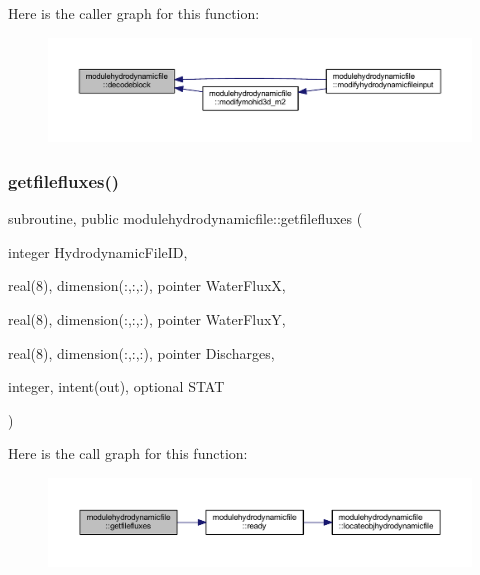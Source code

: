 Here is the caller graph for this function\+:\nopagebreak
\begin{figure}[H]
\begin{center}
\leavevmode
\includegraphics[width=350pt]{namespacemodulehydrodynamicfile_ae7f1a97acd1cc5b22e6ff9e638243e70_icgraph}
\end{center}
\end{figure}
\mbox{\label{namespacemodulehydrodynamicfile_a59c8f54e1b85d7dc3765167672866ffb}} 
\subsubsection{\texorpdfstring{getfilefluxes()}{getfilefluxes()}}
{\footnotesize\ttfamily subroutine, public modulehydrodynamicfile\+::getfilefluxes (\begin{DoxyParamCaption}\item[{integer}]{Hydrodynamic\+File\+ID,  }\item[{real(8), dimension(\+:,\+:,\+:), pointer}]{Water\+FluxX,  }\item[{real(8), dimension(\+:,\+:,\+:), pointer}]{Water\+FluxY,  }\item[{real(8), dimension(\+:,\+:,\+:), pointer}]{Discharges,  }\item[{integer, intent(out), optional}]{S\+T\+AT }\end{DoxyParamCaption})}

Here is the call graph for this function\+:\nopagebreak
\begin{figure}[H]
\begin{center}
\leavevmode
\includegraphics[width=350pt]{namespacemodulehydrodynamicfile_a59c8f54e1b85d7dc3765167672866ffb_cgraph}
\end{center}
\end{figure}
\mbox{\label{namespacemodulehydrodynamicfile_a9b237b5496d01afbf9b2c35f1ed0745c}} 
